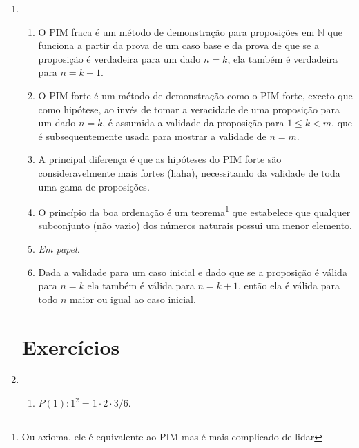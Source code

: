 \documentclass{article}
\begin{document}
\begin{enumerate}

	\item

	      \begin{enumerate}

		      \item O PIM fraca é um método de demonstração para proposições em \( \mathbb{N} \) que funciona a partir da prova de um caso base e da prova de que se a proposição é verdadeira para um dado \( n = k \), ela também é verdadeira para \( n = k + 1 \).

		      \item O PIM forte é um método de demonstração como o PIM forte, exceto que como hipótese, ao invés de tomar a veracidade de uma proposição para um dado \( n = k \), é assumida a validade da proposição para \( 1 \leq k < m \), que é subsequentemente usada para mostrar a validade de \( n = m \).

		      \item A principal diferença é que as hipóteses do PIM forte são consideravelmente mais fortes (haha), necessitando da validade de toda uma gama de proposições.

		      \item O princípio da boa ordenação é um teorema\footnote{Ou axioma, ele é equivalente ao PIM mas é mais complicado de lidar } que estabelece que qualquer subconjunto (não vazio) dos números naturais possui um menor elemento.

		      \item \textit{Em papel.}

		      \item Dada a validade para um caso inicial e dado que se a proposição é válida para \( n = k \) ela também é válida para \( n = k + 1 \), então ela é válida para todo \( n \) maior ou igual ao caso inicial.

	      \end{enumerate}

	      \section*{Exercícios}

	\item

	      \begin{enumerate}

		      \item \( P(1) : 1^2 = 1 \cdot 2 \cdot 3 / 6 \).


\end{enumerate}
\end{enumerate}
\end{document}
